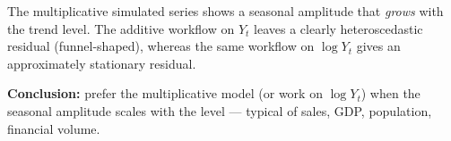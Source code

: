\documentclass[a4paper,11pt]{article}
\begin{document}
\begin{exercise}\end{exercise}

\begin{solution}
The multiplicative simulated series shows a seasonal amplitude that
\emph{grows} with the trend level. The additive workflow on $Y_t$
leaves a clearly heteroscedastic residual (funnel-shaped), whereas
the same workflow on $\log Y_t$ gives an approximately stationary
residual.

\textbf{Conclusion:} prefer the multiplicative model (or work on
$\log Y_t$) when the seasonal amplitude scales with the level — typical
of sales, GDP, population, financial volume.
\end{solution}
\end{document}
